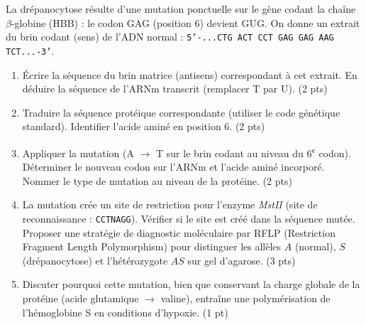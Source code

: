 \documentclass[11pt]{article}
\begin{document}
\begin{exercice}
La drépanocytose résulte d'une mutation ponctuelle sur le gène codant la chaîne $\beta$-globine (HBB) : le codon GAG (position 6) devient GUG. On donne un extrait du brin codant (sens) de l'ADN normal : \texttt{5'-...CTG ACT CCT GAG GAG AAG TCT...-3'}.

\begin{enumerate}
    \item Écrire la séquence du brin matrice (antisens) correspondant à cet extrait. En déduire la séquence de l'ARNm transcrit (remplacer T par U). (2 pts)
    \item Traduire la séquence protéique correspondante (utiliser le code génétique standard). Identifier l'acide aminé en position 6. (2 pts)
    \item Appliquer la mutation (A $\rightarrow$ T sur le brin codant au niveau du 6\textsuperscript{e} codon). Déterminer le nouveau codon sur l'ARNm et l'acide aminé incorporé. Nommer le type de mutation au niveau de la protéine. (2 pts)
    \item La mutation crée un site de restriction pour l'enzyme \textit{MstII} (site de reconnaissance : \texttt{CCTNAGG}). Vérifier si le site est créé dans la séquence mutée. Proposer une stratégie de diagnostic moléculaire par RFLP (Restriction Fragment Length Polymorphism) pour distinguer les allèles $A$ (normal), $S$ (drépanocytose) et l'hétérozygote $AS$ sur gel d'agarose. (3 pts)
    \item Discuter pourquoi cette mutation, bien que conservant la charge globale de la protéine (acide glutamique $\rightarrow$ valine), entraîne une polymérisation de l'hémoglobine S en conditions d'hypoxie. (1 pt)
\end{enumerate}
\end{exercice}
\end{document}

